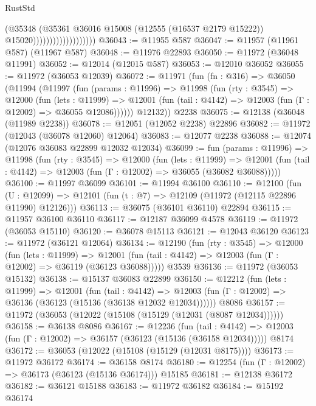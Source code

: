\begin{lexlean}{RustStd}
\begin{coremodule}
                                      (@35348
                                        (@35361
                                          @36016
                                          @15008
                                          (@12555 (@16537 @2179 @15222))
                                          @15020)))))))))))))))))))
@36043 := @11955 @587
@36047 := @11957 (@11961 @587) (@11967 @587)
@36048 := @11976 @22893
@36050 := @11972 (@36048 @11991)
@36052 := @12014 (@12015 @587)
@36053 := @12010 @36052
@36055 := @11972 (@36053 @12039)
@36072 := @11971
    (fun (fn : @316) =>
    @36050
      (@11994
        (@11997
          (fun (params : @11996) =>
          @11998
            (fun (rty : @3545) =>
            @12000
              (fun (lets : @11999) =>
              @12001 (fun (tail : @4142) => @12003 (fun (Γ : @12002) => @36055 @12086))))))
        @12132))
    @2238
@36075 := @12138 (@36048 (@11989 @2238))
@36078 := @12051 (@12052 @2238) @22896
@36082 := @11972 (@12043 (@36078 @12060) @12064)
@36083 := @12077 @2238
@36088 := @12074 (@12076 @36083 @22899 @12032 @12034)
@36099 := fun (params : @11996) =>
  @11998
    (fun (rty : @3545) =>
    @12000
      (fun (lets : @11999) =>
      @12001 (fun (tail : @4142) => @12003 (fun (Γ : @12002) => @36055 (@36082 @36088)))))
@36100 := @11997 @36099
@36101 := @11994 @36100
@36110 := @12100
    (fun (U : @12099) => @12101 (fun (t : @7) => @12109 (@11972 (@12115 @22896 @11990) @12126)))
@36113 := @36075 (@36101 @36110) @22894
@36115 := @11957 @36100 @36110
@36117 := @12187 @36099 @4578
@36119 := @11972 (@36053 @15110)
@36120 := @36078 @15113
@36121 := @12043 @36120
@36123 := @11972 (@36121 @12064)
@36134 := @12190
    (fun (rty : @3545) =>
    @12000
      (fun (lets : @11999) =>
      @12001 (fun (tail : @4142) => @12003 (fun (Γ : @12002) => @36119 (@36123 @36088)))))
    @3539
@36136 := @11972 (@36053 @15132)
@36138 := @15137 @36083 @22899
@36150 := @12212
    (fun (lets : @11999) =>
    @12001
      (fun (tail : @4142) =>
      @12003 (fun (Γ : @12002) => @36136 (@36123 (@15136 (@36138 @12032 @12034))))))
    @8086
@36157 := @11972 (@36053 (@12022 (@15108 (@15129 (@12031 (@8087 @12034))))))
@36158 := @36138 @8086
@36167 := @12236
    (fun (tail : @4142) => @12003 (fun (Γ : @12002) => @36157 (@36123 (@15136 (@36158 @12034)))))
    @8174
@36172 := @36053 (@12022 (@15108 (@15129 (@12031 @8175))))
@36173 := @11972 @36172
@36174 := @36158 @8174
@36180 := @12254 (fun (Γ : @12002) => @36173 (@36123 (@15136 @36174))) @15185
@36181 := @12138 @36172
@36182 := @36121 @15188
@36183 := @11972 @36182
@36184 := @15192 @36174

\end{coremodule}
\end{lexlean}
